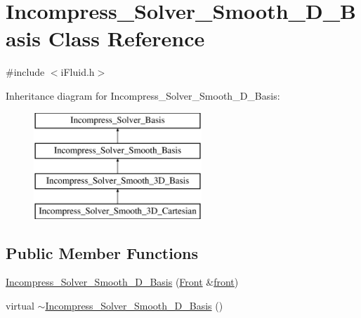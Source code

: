 \hypertarget{class_incompress___solver___smooth__3_d___basis}{}\section{Incompress\+\_\+\+Solver\+\_\+\+Smooth\+\_\+D\+\_\+\+Basis Class Reference}
\label{class_incompress___solver___smooth__3_d___basis}


{\ttfamily \#include $<$i\+Fluid.\+h$>$}

Inheritance diagram for Incompress\+\_\+\+Solver\+\_\+\+Smooth\+\_\+D\+\_\+\+Basis\+:\begin{figure}[H]
\begin{center}
\leavevmode
\includegraphics[height=4.000000cm]{d5/d94/class_incompress___solver___smooth__3_d___basis}
\end{center}
\end{figure}
\subsection*{Public Member Functions}
\begin{DoxyCompactItemize}
\item 
\hyperlink{class_incompress___solver___smooth__3_d___basis_a4683701fed0d4b75eeea21e7a478d6f6}{Incompress\+\_\+\+Solver\+\_\+\+Smooth\+\_\+D\+\_\+\+Basis} (\hyperlink{fdecs_8h_ac32202b798f848095c489cfd04c4ca5f}{Front} \&\hyperlink{class_incompress___solver___smooth___basis_ab792d371ca86ec9ed21b4c95d1375a0b}{front})
\item 
virtual \hyperlink{class_incompress___solver___smooth__3_d___basis_a8b506e6bc406ee8fd35e59745e835571}{$\sim$\+Incompress\+\_\+\+Solver\+\_\+\+Smooth\+\_\+D\+\_\+\+Basis} ()
\end{DoxyCompactItemize}
